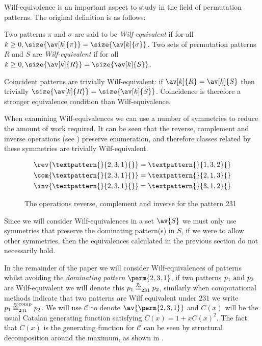 Wilf-equivalence is an important aspect to study in the field of permutation
patterns. The original definition is as follows:

\begin{definition}
  Two patterns \(\pi\) and \(\sigma\) are said to be \emph{Wilf-equivalent}
  if for all \(k\ge0, \size{\av[k]{\pi}} = \size{\av[k]{\sigma}}\). Two sets of
  permutation patterns \(R\) and \(S\) are \emph{Wilf-equivalent} if for all
  \(k\ge0, \size{\av[k]{R}} = \size{\av[k]{S}}\).
\end{definition}

Coincident patterns are trivially Wilf-equivalent: if \(\av[k]{R} = \av[k]{S}\)
then trivially \(\size{\av[k]{R}} = \size{\av[k]{S}}\). Coincidence is
therefore a stronger equivalence condition than Wilf-equivalence.

When examining Wilf-equivalences we can use a number of symmetries to reduce the
amount of work required. It can be seen that the reverse, complement and inverse
operations (see ) preserve enumeration, and therefore
classes related by these symmetries are trivially Wilf-equivalent.
\begin{figure}[!htb]
\begin{align*}
    \rev{\textpattern{}{2,3,1}{}} &= \textpattern{}{1,3,2}{}\\
    \com{\textpattern{}{2,3,1}{}} &= \textpattern{}{2,1,3}{}\\
    \inv{\textpattern{}{2,3,1}{}} &= \textpattern{}{3,1,2}{}
\end{align*}
\caption{The operations reverse, complement and inverse for the pattern 231}
\label{fig:symm}
\end{figure}

Since we will consider Wilf-equivalences in a set \(\av{S}\) we
must only use symmetries that preserve the dominating pattern(s) in \(S\), if we
were to allow other symmetries, then the equivalences calculated in the
previous section do not necessarily hold.

In the remainder of the paper we will consider Wilf-equivalences of patterns
whilst avoiding the \emph{dominating pattern} \(\perm{2,3,1}\), if two patterns
\(p_1 \text{ and } p_2\) are Wilf-equivalent we will denote this \(p_1\weqv{231}p_2\),
similarly when computational methods indicate that two patterns are Wilf
equivalent under \(231\) we write \(p_1\weqv[comp]{231}p_2\). We will use
\(\mathcal{C}\) to denote \(\av{\perm{2,3,1}}\) and \(C(x)\) will be the usual
Catalan generating function satisfying \(C(x) = 1 + xC(x)^2\). The fact that
\(C(x)\) is the generating function for \(\mathcal{C}\) can be seen by
structural decomposition around the maximum, as
shown in .

